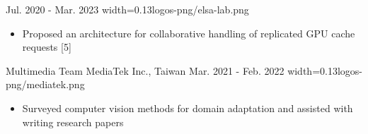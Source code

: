 \documentclass{cvclass}
\begin{document}
    {Jul. 2020 - Mar. 2023}
    {width=0.13\linewidth}{logos-png/elsa-lab.png}
\begin{itemize}
    \item Proposed an architecture for collaborative handling of replicated GPU cache requests [5]
\end{itemize}
    {Multimedia Team}
    {MediaTek Inc., Taiwan}
    {Mar. 2021 - Feb. 2022}
    {width=0.13\linewidth}{logos-png/mediatek.png}
\begin{itemize}
    \item Surveyed computer vision methods for domain adaptation and assisted with writing research papers
\end{itemize}




\end{document}
